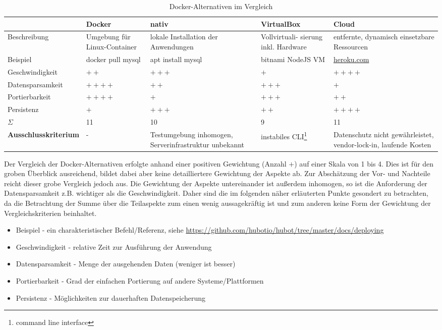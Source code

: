\begin{table}[H]
    \centering
    \begin{tabularx}{\textwidth}{|l|X|X|X|X|}
        \hline
        & \textbf{Docker} & \textbf{nativ} & \textbf{VirtualBox} & \textbf{Cloud} \\
        \hline
        Beschreibung & Umgebung für Linux-Container & lokale Installation der Anwendungen & Vollvirtuali- sierung inkl. Hardware & entfernte, dynamisch einsetzbare Ressourcen \\
        \hline
        Beispiel & docker pull mysql & apt install mysql & bitnami NodeJS VM & \url{heroku.com} \\
        \hline
        Geschwindigkeit     & $++$      & $+++$     & $+$   & $++++$ \\
        \hline
        Datensparsamkeit    & $++++$    & $++$      & $+++$ & $+$ \\
        \hline
        Portierbarkeit      & $++++$    & $+$       & $+++$ & $++$ \\
        \hline
        Persistenz          & $+$       & $+++$     & $++$  & $++++$ \\
        \hline
        \hline
        $\Sigma$            & 11        & 10        & 9     & 11 \\ 
        \hline
        \textbf{Ausschlusskriterium} & - & Testumgebung inhomogen, Serverinfrastruktur unbekannt & instabiles CLI\footnote{command line interface} & Datenschutz nicht gewährleistet, vendor-lock-in, laufende Kosten \\
        \hline
    \end{tabularx}
    \caption{Docker-Alternativen im Vergleich}
    \label{tab:docker-alternatives}
\end{table}

Der Vergleich der Docker-Alternativen erfolgte anhand einer positiven Gewichtung (Anzahl $+$) auf einer Skala von 1 bis 4. Dies ist für den groben Überblick ausreichend, bildet dabei aber keine detailliertere Gewichtung der Aspekte ab. Zur Abschätzung der Vor- und Nachteile reicht dieser grobe Vergleich jedoch aus. Die Gewichtung der Aspekte untereinander ist außerdem inhomogen, so ist die Anforderung der Datensparsamkeit z.B. wichtiger als die Geschwindigkeit. Daher sind die im folgenden näher erläuterten Punkte gesondert zu betrachten, da die Betrachtung der Summe über die Teilaspekte zum einen wenig aussagekräftig ist und zum anderen keine Form der Gewichtung der Vergleichskriterien beinhaltet.

\begin{itemize}
    \item Beispiel - ein charakteristischer Befehl/Referenz, siehe \url{https://github.com/hubotio/hubot/tree/master/docs/deploying}
    \item Geschwindigkeit - relative Zeit zur Ausführung der Anwendung
    \item Datensparsamkeit - Menge der ausgehenden Daten (weniger ist besser)
    \item Portierbarkeit - Grad der einfachen Portierung auf andere Systeme/Plattformen
    \item Persistenz - Möglichkeiten zur dauerhaften Datenspeicherung
\end{itemize}

